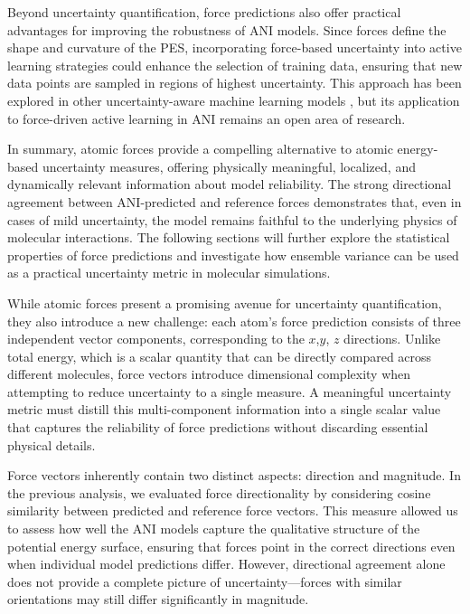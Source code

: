 Beyond uncertainty quantification, force predictions also offer practical advantages for improving the robustness of ANI models. Since forces define the shape and curvature of the PES, incorporating force-based uncertainty into active learning strategies could enhance the selection of training data, ensuring that new data points are sampled in regions of highest uncertainty. This approach has been explored in other uncertainty-aware machine learning models \cite{uncertainty_atomistic_ml_peterson}, but its application to force-driven active learning in ANI remains an open area of research.

In summary, atomic forces provide a compelling alternative to atomic energy-based uncertainty measures, offering physically meaningful, localized, and dynamically relevant information about model reliability. The strong directional agreement between ANI-predicted and reference forces demonstrates that, even in cases of mild uncertainty, the model remains faithful to the underlying physics of molecular interactions. The following sections will further explore the statistical properties of force predictions and investigate how ensemble variance can be used as a practical uncertainty metric in molecular simulations.

While atomic forces present a promising avenue for uncertainty quantification, they also introduce a new challenge: each atom's force prediction consists of three independent vector components, corresponding to the 
$x$,$y$, $z$ directions. Unlike total energy, which is a scalar quantity that can be directly compared across different molecules, force vectors introduce dimensional complexity when attempting to reduce uncertainty to a single measure. A meaningful uncertainty metric must distill this multi-component information into a single scalar value that captures the reliability of force predictions without discarding essential physical details.

Force vectors inherently contain two distinct aspects: direction and magnitude. In the previous analysis, we evaluated force directionality by considering cosine similarity between predicted and reference force vectors. This measure allowed us to assess how well the ANI models capture the qualitative structure of the potential energy surface, ensuring that forces point in the correct directions even when individual model predictions differ. However, directional agreement alone does not provide a complete picture of uncertainty—forces with similar orientations may still differ significantly in magnitude.

